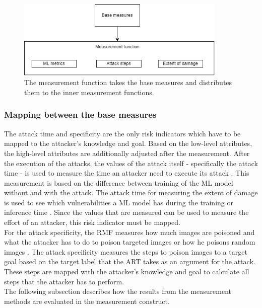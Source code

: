 \begin{figure}[ht!]
  \centering
  \includegraphics[width=10cm]{pictures/impl_meas_func.png}
  \caption{The measurement function takes the base measures and distributes them to the inner measurement functions.}
  \label{fig:impl_meas_func}
\end{figure}

\subsubsection*{Mapping between the base measures}

The attack time and specificity are the only risk indicators which have to be mapped to the attacker's knowledge and goal. Based on the low-level attributes, the high-level attributes are additionally adjusted after the measurement. After the execution of the attacks, the values of the attack itself - specifically the attack time - is used to measure the time an attacker need to execute its attack \cite{DBLP:journals/corr/abs-2012-04884}. This measurement is based on the difference between training of the ML model without and with the attack. The attack time for measuring the extent of damage is used to see which vulnerabilities a ML model has during the training or inference time \cite{DBLP:journals/csur/RosenbergSER21}. Since the values that are measured can be used to measure the effort of an attacker, this risk indicator must be mapped. \\
For the attack specificity, the RMF measures how much images are poisoned and what the attacker has to do to poison targeted images \cite{DBLP:conf/iccv/ZhuNXWW21} or how he poisons random images \cite{DBLP:journals/corr/abs-1708-06733}. The attack specificity measures the steps to poison images to a target goal based on the target label that the ART takes as an argument for the attack. These steps are mapped with the attacker's knowledge and goal to calculate all steps that the attacker has to perform. \\
The following subsection describes how the results from the measurement methods are evaluated in the measurement construct. \\ \\

